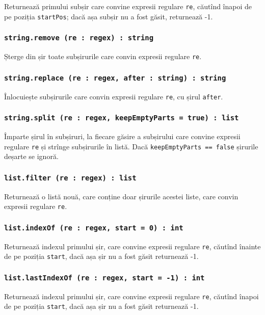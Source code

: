 Returnează primului subșir care convine expresii regulare \texttt{re}, căutînd înapoi de pe poziția \texttt{startPos}; dacă așa subșir nu a fost găsit, returnează -1.

\subsubsection{\texttt{string.remove (re : regex) : string}}

Șterge din șir toate subșirurile care convin expresii regulare \texttt{re}.

\subsubsection{\texttt{string.replace (re : regex, after : string) : string}}

Înlocuiește subșirurile care convin expresii regulare \texttt{re}, cu șirul \texttt{after}.

\subsubsection{\texttt{string.split (re : regex, keepEmptyParts = true) : list}}

Împarte șirul în subșiruri, la fiecare găsire a subșirului care convine expresii regulare \texttt{re} și strînge subșirurile în listă. Dacă \texttt{keepEmptyParts == false} șirurile deșarte se ignoră.

\subsubsection{\texttt{list.filter (re : regex) : list}}

Returnează o listă nouă, care conține doar șirurile acestei liste, care convin expresii regulare \texttt{re}.

\subsubsection{\texttt{list.indexOf (re : regex, start = 0) : int}}

Returnează indexul primului șir, care convine expresii regulare \texttt{re}, căutînd înainte de pe poziția \texttt{start}, dacă așa șir nu a fost găsit returnează -1.

\subsubsection{\texttt{list.lastIndexOf (re : regex, start = -1) : int}}

Returnează indexul primului șir, care convine expresii regulare \texttt{re}, căutînd înapoi de pe poziția \texttt{start}, dacă așa șir nu a fost găsit returnează -1.


